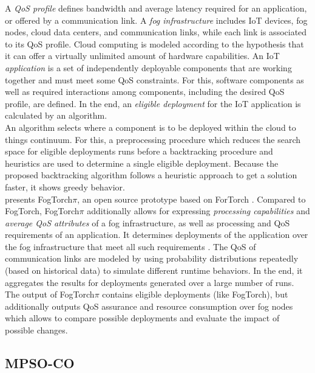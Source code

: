 A \textit{QoS profile} defines bandwidth and average latency required for an application, or offered by a communication link.
A \textit{fog infrastructure} includes IoT devices, fog nodes, cloud data centers, and communication links, while each link is associated to its QoS profile.
Cloud computing is modeled according to the hypothesis that it can offer a virtually unlimited amount of hardware capabilities.
An IoT \textit{application} is a set of independently deployable components that are working together and must meet some QoS constraints.
For this, software components as well as required interactions among components, including the desired QoS profile, are defined.
In the end, an \textit{eligible deployment} for the IoT application is calculated by an algorithm.\\

An algorithm selects where a component is to be deployed within the cloud to things continuum. For this, a preprocessing procedure which reduces the search space for eligible deployments runs before a backtracking procedure and heuristics are used to determine a single eligible deployment. Because the proposed backtracking algorithm follows a heuristic approach to get a solution faster, it shows greedy behavior.\\

\cite{fogtorchpi} presents FogTorch$\pi$, an open source prototype based on ForTorch \cite{fogtorch}.
Compared to FogTorch, FogTorch$\pi$ additionally allows for expressing \textit{processing capabilities} and \textit{average QoS attributes} of a fog infrastructure, as well as processing and QoS requirements of an application.
It determines deployments of the application over the fog infrastructure that meet all such requirements \cite{fogtorchpi}.
The QoS of communication links are modeled by using probability distributions repeatedly (based on historical data) to simulate different runtime behaviors.
In the end, it aggregates the results for deployments generated over a large number of runs.
The output of FogTorch$\pi$ contains eligible deployments (like FogTorch), but additionally outputs QoS assurance and resource consumption over fog nodes which allows to compare possible deployments and evaluate the impact of possible changes.

\subsection*{MPSO-CO}


